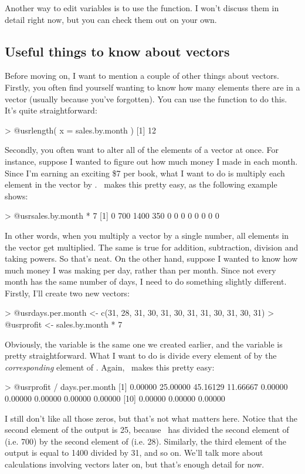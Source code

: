 Another way to edit variables is to use the  function. I won't discuss them in detail right now, but you can check them out on your own. 


\subsection{Useful things to know about vectors~\label{sec:veclength}}

Before moving on, I want to mention a couple of other things about vectors. Firstly, you often find yourself wanting to know how many elements there are in a vector (usually because you've forgotten). You can use the  function to do this. It's quite straightforward:
\begin{rblock1}
> @usr{length( x = sales.by.month )}
[1] 12
\end{rblock1}

\noindent
Secondly, you often want to alter all of the elements of a vector at once. For instance, suppose I wanted to figure out how much money I made in each month. Since I'm earning an exciting \$7 per book, what I want to do is multiply each element in the  vector by . \R\ makes this pretty easy, as the following example shows:
\begin{rblock1}
> @usr{sales.by.month * 7}
 [1]    0  700 1400  350    0    0    0    0    0    0    0    0
\end{rblock1}
In other words, when you multiply a vector by a single number, all elements in the vector get multiplied. The same is true for addition, subtraction, division and taking powers. So that's neat. On the other hand, suppose I wanted to know how much money I was making per day, rather than per month. Since not every month has the same number of days, I need to do something slightly different. Firstly, I'll create two new vectors:
\begin{rblock1}
> @usr{days.per.month <- c(31, 28, 31, 30, 31, 30, 31, 31, 30, 31, 30, 31)}
> @usr{profit <- sales.by.month * 7}
\end{rblock1}
Obviously, the  variable is the same one we created earlier, and the  variable is pretty straightforward. What I want to do is divide every element of  by the {\it corresponding} element of . Again, \R\ makes this pretty easy:
\begin{rblock1}
> @usr{profit / days.per.month}
 [1]  0.00000 25.00000 45.16129 11.66667  0.00000  0.00000  0.00000  0.00000  0.00000
[10]  0.00000  0.00000  0.00000
\end{rblock1}
I still don't like all those zeros, but that's not what matters here. Notice that the second element of the output is 25, because \R\ has divided the second element of  (i.e. 700) by the second element of  (i.e. 28). Similarly, the third element of the output is equal to 1400 divided by 31, and so on. We'll talk more about calculations involving vectors later on, but that's enough detail for now.

